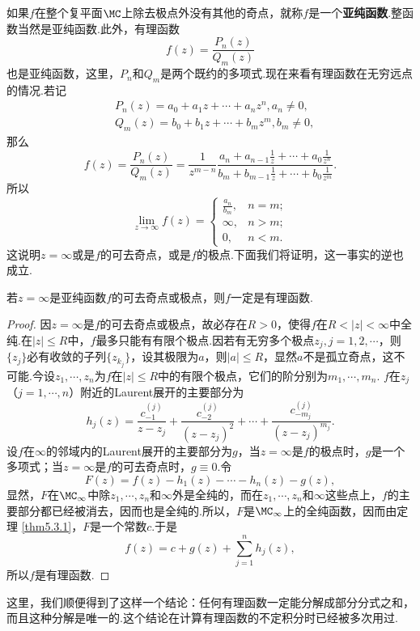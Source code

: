 如果$f$在整个复平面$\MC$上除去极点外没有其他的奇点，就称$f$是一个\textbf{亚纯函数}.整函数当然是亚纯函数.此外，有理函数
\[f(z)=\frac{P_n(z)}{Q_m(z)}\]
也是亚纯函数，这里，$P_n$和$Q_m$是两个既约的多项式.现在来看有理函数在无穷远点的情况.若记
\begin{align*}
&P_n(z)=a_0+a_1z+\cdots+a_nz^n,a_n\ne0,\\
&Q_m(z)=b_0+b_1z+\cdots+b_mz^m,b_m\ne0,
\end{align*}
那么
\[f(z)=\frac{P_n(z)}{Q_m(z)}=\frac1{z^{m-n}}\frac{a_n+a_{n-1}\frac1z+\cdots+a_0\frac1{z^n}}
{b_m+b_{m-1}\frac1z+\cdots+b_0\frac1{z^m}}.\]
所以
\[\lim_{z\to\infty}f(z)=\begin{cases}
\frac{a_n}{b_m},&n=m;\\
\infty,&n>m;\\
0,&n<m.
\end{cases}\]
这说明$z=\infty$或是$f$的可去奇点，或是$f$的极点.下面我们将证明，这一事实的逆也成立.
\begin{theorem}\label{thm5.3.3}
若$z=\infty$是亚纯函数$f$的可去奇点或极点，则$f$一定是有理函数.
\end{theorem}
\begin{proof}
因$z=\infty$是$f$的可去奇点或极点，故必存在$R>0$，使得$f$在$R<|z|<\infty$中全纯.在$|z|\le R $中，$f$最多只能有有限个极点.因若有无穷多个极点$z_j,j=1,2,\cdots$，则$\{z_j\}$必有收敛的子列$\{z_{k_j}\}$，设其极限为$a$，则$|a|\le R$，显然$a$不是孤立奇点，这不可能.今设$z_1,\cdots,z_n$为$f$在$|z|\le R$中的有限个极点，它们的阶分别为$m_1,\cdots,m_n$. $f$在$z_j$（$j=1,\cdots,n$）附近的Laurent展开的主要部分为
\[h_j(z)=\frac{c_{-1}^{(j)}}{z-z_j}+\frac{c_{-2}^{(j)}}{(z-z_j)^2}
+\cdots+\frac{c_{-m_j}^{(j)}}{(z-z_j)^{m_j}}.\]
设$f$在$\infty$的邻域内的Laurent展开的主要部分为$g$，当$z=\infty$是$f$的极点时，$g$是一个多项式；当$z=\infty$是$f$的可去奇点时，$g\equiv0$.令
\[F(z)=f(z)-h_1(z)-\cdots-h_n(z)-g(z),\]
显然，$F$在$\MC_\infty$中除$z_1,\cdots,z_n$和$\infty$外是全纯的，而在$z_1,\cdots,z_n$和$\infty$这些点上，$f$的主要部分都已经被消去，因而也是全纯的.所以，$F$是$\MC_\infty$上的全纯函数，因而由定理 \ref{thm5.3.1}，$F$是一个常数$c$.于是
\[f(z)=c+g(z)+\sum_{j=1}^n h_j(z),\]
所以$f$是有理函数.
\end{proof}

这里，我们顺便得到了这样一个结论：任何有理函数一定能分解成部分分式之和，而且这种分解是唯一的.这个结论在计算有理函数的不定积分时已经被多次用过.

